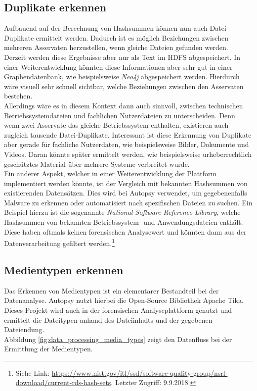 \subsection{Duplikate erkennen}
\label{subsec:duplicate_files}
Aufbauend auf der Berechnung von Hashsummen können nun auch Datei-Duplikate ermittelt werden. Dadurch ist es möglich Beziehungen zwischen mehreren Asservaten herzustellen, wenn gleiche Dateien gefunden werden.\\
Derzeit werden diese Ergebnisse aber nur als Text im HDFS abgespeichert. In einer Weiterentwicklung könnten diese Informationen aber sehr gut in einer Graphendatenbank, wie beispielsweise \textit{Neo4j} abgespeichert werden. Hierdurch wäre visuell sehr schnell sichtbar, welche Beziehungen zwischen den Asservaten bestehen.\\ 
Allerdings wäre es in diesem Kontext dann auch sinnvoll, zwischen technischen Betriebssystemdateien und fachlichen Nutzerdateien zu unterscheiden. Denn wenn zwei Asservate das gleiche Betriebssystem enthalten, existieren auch zugleich tausende Datei-Duplikate. Interessant ist diese Erkennung von Duplikate aber gerade für fachliche Nutzerdaten, wie beispielsweise Bilder, Dokumente und Videos. Daran könnte später ermittelt werden, wie beispielsweise urheberrechtlich geschütztes Material über mehrere Systeme verbreitet wurde.\\

\noindent
Ein anderer Aspekt, welcher in einer Weiterentwicklung der Plattform implementiert werden könnte, ist der Vergleich mit bekannten Hashsummen von existierenden Datensätzen. Dies wird bei Autopsy verwendet, um gegebenenfalls Malware zu erkennen oder automatisiert nach spezifischen Dateien zu suchen. Ein Beispiel hierzu ist die sogenannte \textit{National Software Reference Library}, welche Hashsummen von bekannten Betriebssystem- und Anwendungsdateien enthält. Diese haben oftmals keinen forensischen Analysewert und könnten dann aus der Datenverarbeitung gefiltert werden.\footnote{Siehe Link: \url{https://www.nist.gov/itl/ssd/software-quality-group/nsrl-download/current-rds-hash-sets}. Letzter Zugriff: 9.9.2018.} \cite[S. 36]{digital_forensics}

\subsection{Medientypen erkennen}
\label{subsec:media_types}

Das Erkennen von Medientypen ist ein elementarer Bestandteil bei der Datenanalyse. Autopsy nutzt hierbei die Open-Source Bibliothek Apache Tika\texttrademark. Dieses Projekt wird auch in der forensischen Analyseplattform genutzt und ermittelt die Dateitypen anhand des Dateiinhalts und der gegebenen Dateiendung.\\
Abbildung \ref{fig:data_processing_media_types} zeigt den Datenfluss bei der Ermittlung der Medientypen.\\

